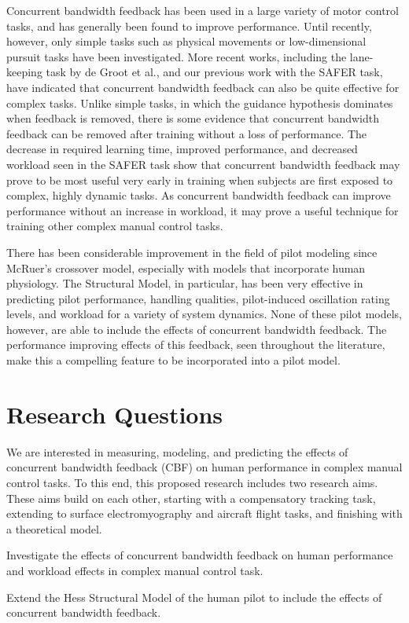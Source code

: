 Concurrent bandwidth feedback has been used in a large variety of motor control tasks, and has generally been found to improve performance.
Until recently, however, only simple tasks such as physical movements or low-dimensional pursuit tasks have been investigated.
More recent works, including the lane-keeping task by de Groot et al., and our previous work with the SAFER task, have indicated that concurrent bandwidth feedback can also be quite effective for complex tasks.
Unlike simple tasks, in which the guidance hypothesis dominates when feedback is removed, there is some evidence that concurrent bandwidth feedback can be removed after training without a loss of performance.
The decrease in required learning time, improved performance, and decreased workload seen in the SAFER task show that concurrent bandwidth feedback may prove to be most useful very early in training when subjects are first exposed to complex, highly dynamic tasks.
As concurrent bandwidth feedback can improve performance without an increase in workload, it may prove a useful technique for training other complex manual control tasks.

There has been considerable improvement in the field of pilot modeling since McRuer's crossover model, especially with models that incorporate human physiology.
The Structural Model, in particular, has been very effective in predicting pilot performance, handling qualities, pilot-induced oscillation rating levels, and workload for a variety of system dynamics.
None of these pilot models, however, are able to include the effects of concurrent bandwidth feedback.
The performance improving effects of this feedback, seen throughout the literature, make this a compelling feature to be incorporated into a pilot model.

\section{Research Questions}
\label{sec:intro_questions}
We are interested in measuring, modeling, and predicting the effects of concurrent bandwidth feedback (CBF) on human performance in complex manual control tasks.
To this end, this proposed research includes two research aims.
These aims build on each other, starting with a compensatory tracking task, extending to surface electromyography and aircraft flight tasks, and finishing with a theoretical model.
\begin{description}[align=left]
    \item [Aim One] Investigate the effects of concurrent bandwidth feedback on human performance and workload effects in complex manual control task.
    \item [Aim Two] Extend the Hess Structural Model of the human pilot to include the effects of concurrent bandwidth feedback.
\end{description}

